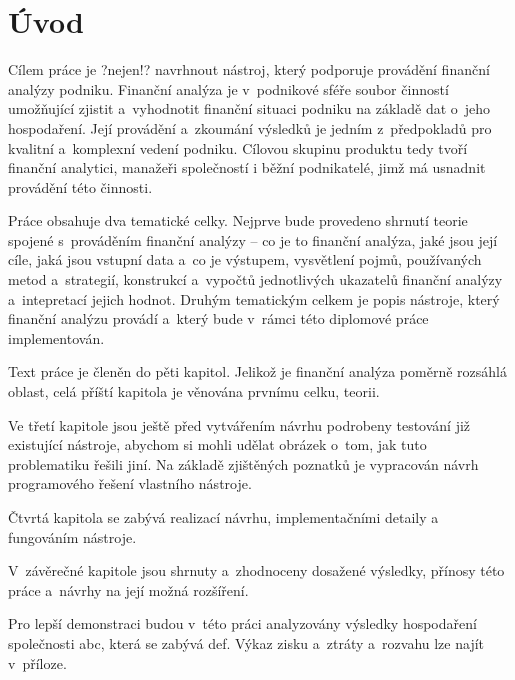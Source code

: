 \chapter{Úvod}
Cílem práce je ?nejen!? navrhnout nástroj, který podporuje provádění finanční analýzy podniku. Finanční analýza je v~podnikové sféře soubor činností umožňující zjistit a~vyhodnotit finanční situaci podniku na základě dat o~jeho hospodaření. Její provádění a~zkoumání výsledků je jedním z~předpokladů pro kvalitní a~komplexní vedení podniku. Cílovou skupinu produktu tedy tvoří finanční analytici, manažeři společností i běžní podnikatelé, jimž má usnadnit provádění této činnosti.

Práce obsahuje dva tematické celky. Nejprve bude provedeno shrnutí teorie spojené s~prováděním finanční analýzy -- co je to finanční analýza, jaké jsou její cíle, jaká jsou vstupní data a~co je výstupem, vysvětlení pojmů, používaných metod a~strategií, konstrukcí a~vypočtů jednotlivých ukazatelů finanční analýzy a~intepretací jejich hodnot. 
Druhým tematickým celkem je popis nástroje, který finanční analýzu provádí a~který bude v~rámci této diplomové práce implementován. 

Text práce je členěn do pěti kapitol. Jelikož je finanční analýza poměrně rozsáhlá oblast, celá příští kapitola je věnována prvnímu celku, teorii. 

Ve třetí kapitole jsou ještě před vytvářením návrhu podrobeny testování již existující nástroje, abychom si mohli udělat obrázek o~tom, jak tuto problematiku řešili jiní. Na základě zjištěných poznatků je vypracován návrh programového řešení vlastního nástroje.

Čtvrtá kapitola se zabývá realizací návrhu, implementačními detaily a fungováním nástroje. 

V~závěrečné kapitole jsou shrnuty a~zhodnoceny dosažené výsledky, přínosy této práce a~návrhy na její možná rozšíření.

Pro lepší demonstraci budou v~této práci analyzovány výsledky hospodaření společnosti abc, která se zabývá def. Výkaz zisku a~ztráty a~rozvahu lze najít v~příloze.





























